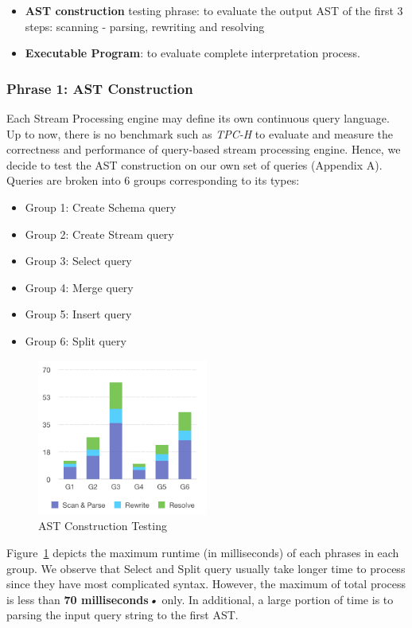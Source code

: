 \begin{itemize}
	\item \textbf{AST construction} testing phrase: to evaluate the output AST of the first 3 steps: scanning -  parsing, rewriting and resolving
	\item \textbf{Executable Program}: to evaluate complete interpretation process.
\end{itemize}

\subsubsection{Phrase 1: AST Construction}
Each Stream Processing engine may define its own continuous query language. Up to now, there is no benchmark such as \textit{TPC-H} to evaluate and measure the correctness and performance of query-based stream processing engine. 
Hence, we decide to test the AST construction on our own set of queries (Appendix A). Queries are broken into 6 groups corresponding to its types: 
\begin{itemize}
	\item Group 1: Create Schema query
	\item Group 2: Create Stream query
	\item Group 3: Select query
	\item Group 4: Merge query
	\item Group 5: Insert query
	\item Group 6: Split query
\end{itemize} 

\begin{figure}[h!] 
\centering    
\includegraphics[width=0.5\textwidth]{ASTConstruction}
\caption{AST Construction Testing}
\label{fig:ASTConstruction}
\end{figure}

Figure~\ref{fig:ASTConstruction} depicts the maximum runtime (in milliseconds) of each phrases in each group. We observe that Select and Split query usually take longer time to process since they have most complicated syntax. However, the maximum of total process is less than \textbf{70 milliseconds\textit{•}} only. In additional, a large portion of time is to parsing the input query string to the first AST. 


